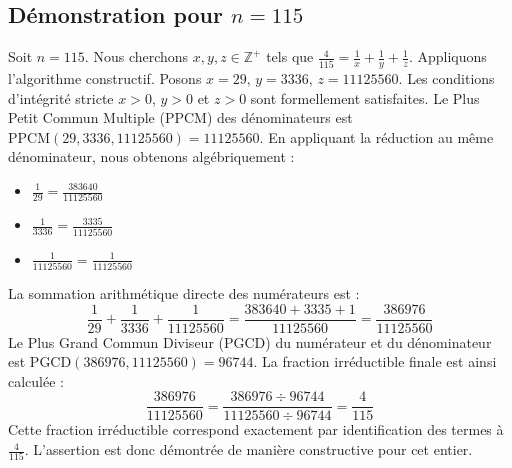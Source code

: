 \documentclass[11pt,a4paper]{article}
\begin{document}
\subsection{Démonstration pour $n = 115$}
Soit $n = 115$. Nous cherchons $x, y, z \in \mathbb{Z}^{+}$ tels que $\frac{4}{115} = \frac{1}{x} + \frac{1}{y} + \frac{1}{z}$.
Appliquons l'algorithme constructif. Posons $x = 29$, $y = 3336$, $z = 11125560$.
Les conditions d'intégrité stricte $x > 0$, $y > 0$ et $z > 0$ sont formellement satisfaites.
Le Plus Petit Commun Multiple (PPCM) des dénominateurs est $\text{PPCM}(29, 3336, 11125560) = 11125560$.
En appliquant la réduction au même dénominateur, nous obtenons algébriquement :
\begin{itemize}
    \item $\frac{1}{29} = \frac{383640}{11125560}$
    \item $\frac{1}{3336} = \frac{3335}{11125560}$
    \item $\frac{1}{11125560} = \frac{1}{11125560}$
\end{itemize}
La sommation arithmétique directe des numérateurs est :
$$ \frac{1}{29} + \frac{1}{3336} + \frac{1}{11125560} = \frac{383640 + 3335 + 1}{11125560} = \frac{386976}{11125560} $$
Le Plus Grand Commun Diviseur (PGCD) du numérateur et du dénominateur est $\text{PGCD}(386976, 11125560) = 96744$.
La fraction irréductible finale est ainsi calculée :
$$ \frac{386976}{11125560} = \frac{386976 \div 96744}{11125560 \div 96744} = \frac{4}{115} $$
Cette fraction irréductible correspond exactement par identification des termes à $\frac{4}{115}$. L'assertion est donc démontrée de manière constructive pour cet entier.
\end{document}

